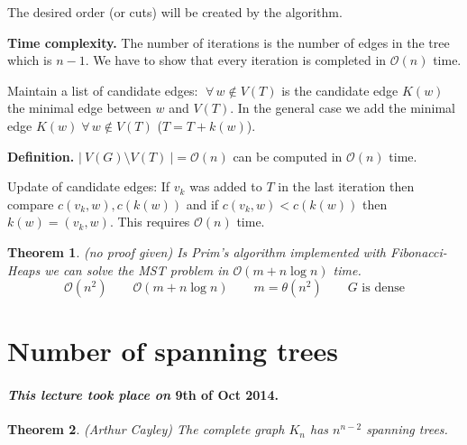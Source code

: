 \documentclass{article}
\newtheorem{theorem}{Theorem}
\newcommand{\card}[1]{\left|\:\!#1\:\!\right|}
\newcommand{\dateref}[1]{\paragraph{\textit{This lecture took place on} #1.}}
\newcommand{\fall}{\;\forall\,}
\begin{document}
The desired order (or cuts) will be created by the algorithm.

\textbf{Time complexity.} The number of iterations is the number of edges in the tree which is $n-1$.
We have to show that every iteration is completed in $\mathcal{O}(n)$ time.

Maintain a list of candidate edges: $\fall w \notin V(T)$ is the candidate edge $K(w)$ the minimal edge between $w$ and $V(T)$.
In the general case we add the minimal edge $K(w) \fall w \notin V(T)$ ($T = T + k(w)$).

\textbf{Definition.}
  $\card{V(G) \setminus V(T)} = \mathcal{O}(n)$ can be computed in $\mathcal{O}(n)$ time.

Update of candidate edges: If $v_k$ was added to $T$ in the last iteration then compare $c(v_k, w), c(k(w))$ and if $c(v_k, w) < c(k(w))$ then $k(w) = (v_k, w)$. This requires $\mathcal{O}(n)$ time.

\begin{theorem}\label{satz-2.7}
  (no proof given)
  Is Prim's algorithm implemented with Fibonacci-Heaps we can solve the MST problem in $\mathcal{O}(m + n\log{n})$ time.
  \[
    \mathcal{O}(n^2) \qquad \mathcal{O}(m + n\log{n}) \qquad m = \theta(n^2) \qquad G \text{ is dense}
  \]
\end{theorem}

\section{Number of spanning trees}

\dateref{9th of Oct 2014}

\begin{theorem}\label{satz-2.8}
  (Arthur Cayley)
  The complete graph $K_n$ has $n^{n-2}$ spanning trees.
\end{theorem}
\end{document}
